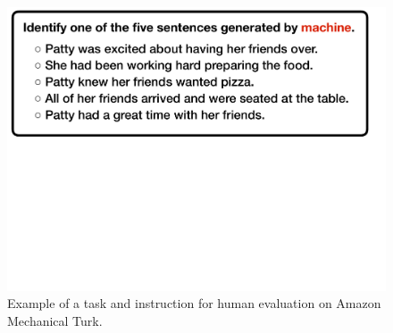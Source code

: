 \begin{figure}[ht]
    \centering
    \includegraphics[width=1\linewidth]{figures/ilm_interface.pdf}
    \vspace{-3.5cm}
    \caption{Example of a task and instruction for human evaluation on Amazon Mechanical Turk.}\label{fig:amt_example}
\end{figure}

